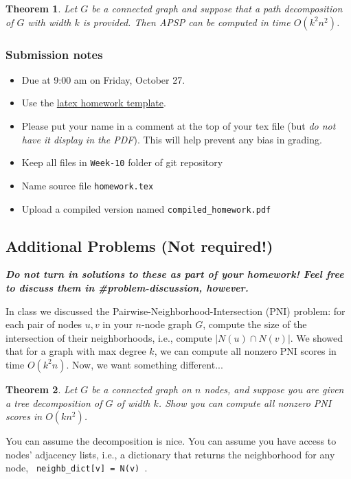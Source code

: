 \documentclass{article}
\newtheorem*{theorem}{Theorem}
\begin{document}
\begin{theorem}
Let $G$ be a connected graph and suppose that a path decomposition of $G$ with width $k$ is provided. Then \textsc{APSP} can be computed in time $O(k^2 n^2)$.
\end{theorem}

\subsubsection*{Submission notes}
\begin{itemize}
\item Due at 9:00 am on Friday, October 27.
\item Use the \href{https://github.com/bdsullivan/ParameterizedAlgorithms-Fall2017/tree/master/templates/homework}{latex homework template}.
\item Please put your name in a comment at the top of your tex file (but {\it do not
have it display in the PDF}). This will help prevent any bias in grading.
\item Keep all files in \texttt{Week-10} folder of git repository
\item Name source file \texttt{homework.tex}
\item Upload a compiled version named \texttt{compiled\_homework.pdf}
\end{itemize}


\subsection*{Additional Problems (Not required!)}
\textbf{\textit{Do not turn in solutions to these as part of your homework! Feel free to discuss them in \#problem-discussion, however.}}

    In class we discussed the Pairwise-Neighborhood-Intersection (PNI) problem: for each pair of nodes $u, v$ in your $n$-node graph $G$, compute the size of the intersection of their neighborhoods, i.e., compute $| N(u) \cap N(v) |$.
    We showed that for a graph with max degree $k$, we can compute all nonzero PNI scores in time $O( k^2 n)$. Now, we want something different...

\begin{theorem}
    Let $G$ be a connected graph on $n$ nodes, and suppose you are given a tree decomposition of $G$ of width $k$. Show you can compute all nonzero PNI scores in $O(k n^2)$.
\end{theorem}

You can assume the decomposition is nice. You can assume you have access to nodes' adjacency lists, i.e., a dictionary that returns the neighborhood for any node, \verb| neighb_dict[v] = N(v) |.


\vfill
\end{document}
